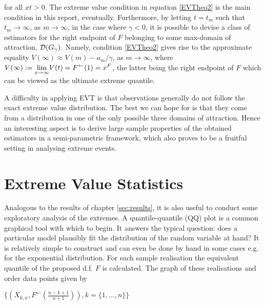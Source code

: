 \noindent for all $ xt > 0 $. The extreme value condition in equation \ref{EVTheo2} is the main condition in this report, eventually. Furthermore, by letting $ t = t_m $ such that $ t_m \rightarrow \infty $, as $ m \rightarrow \infty $, in the case where $ \gamma < 0 $, it is possible to devise a class of estimators for the right endpoint of $F$ belonging to some max-domain of attraction, $ {\mathcal{D}} (G_\gamma) $.  Namely, condition \ref{EVTheo2} gives rise to the approximate equality $ V(\infty) \approx V(m) - a_m / \gamma $, as $ m \rightarrow \infty $, where $ V(\infty ) := \displaystyle {\lim_{x \rightarrow{\infty}}} V(t) = F^{\leftarrow}(1) = x^F $, the latter being the right endpoint of $F$ which can be viewed as the ultimate extreme quantile.



A difficulty in applying EVT is that observations generally do not follow the exact extreme value distribution. The best we can hope for is that they come from a distribution in one of the only possible three domains of attraction. Hence an interesting aspect is to derive large sample properties of the obtained estimators in a %
semi-parametric framework, which also proves to be a  fruitful setting in analysing extreme events. 


\section{Extreme Value Statistics} \label{subsec:EVres}

Analogous to the results of chapter \ref{sec:results}, it is also useful to conduct some exploratory analysis of the extremes. A quantile-quantile (QQ) plot is a common graphical tool with which to begin. It answers the typical question: does a particular model plausibly fit the distribution of the random variable at hand? It is relatively simple to construct and can even be done by hand in some cases e.g. for the exponential distribution. For each sample realisation the equivalent quantile of the proposed d.f. $F$ is calculated. The graph of these realisations and order data points given by \newline
\centerline{$\{(X_{k,n},F^{\leftarrow}(\frac{n-k+1}{n+1})), k = \{1,...,n\}\}$}

